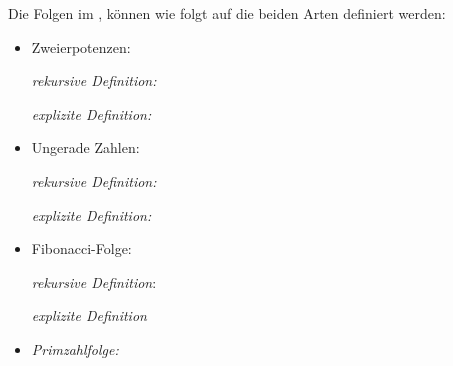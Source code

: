 Die Folgen im , können wie folgt auf die beiden Arten definiert werden:
\begin{itemize}
    \item Zweierpotenzen:
    
    \emph{rekursive Definition:} 
    \vspace*{1cm}
    
    
    \emph{explizite Definition:} %
    \vspace*{1cm}
    \newpage
    \item 	Ungerade Zahlen:
    
    \emph{rekursive Definition:}  %
    \vspace*{1cm}

    \emph{explizite Definition:}  %
    \vspace*{1cm}

    \item 	Fibonacci-Folge:
    
    \emph{rekursive Definition}: %
    \vspace*{1cm}

    \emph{explizite Definition} 
    \vspace*{1cm}

    \item \emph{Primzahlfolge:} %
    \vspace*{1cm}

\end{itemize}

